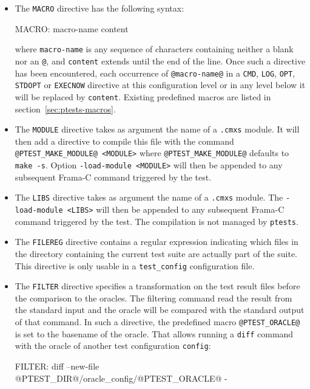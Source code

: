 \begin{itemize}
\item The \texttt{MACRO} directive
  has the following syntax:
  \begin{code}
    MACRO: macro-name content
  \end{code}
  where \texttt{macro-name} is any sequence of characters containing neither
  a blank nor an \texttt{@}, and \texttt{content} extends until the end of the
  line. Once such a directive has been encountered, each occurrence of
  \texttt{@macro-name@} in a \texttt{CMD}, \texttt{LOG}, \texttt{OPT},
  \texttt{STDOPT} or \texttt{EXECNOW} directive at this configuration level
  or in any level below it will be replaced by \texttt{content}. Existing
  predefined macros are listed in section~\ref{sec:ptests-macros}.
\item The \texttt{MODULE}
 directive takes as argument the name of a \texttt{.cmxs}
  module. It will then add a directive to compile this file with the
  command \texttt{@PTEST\_MAKE\_MODULE@ <MODULE>} where
  \texttt{@PTEST\_MAKE\_MODULE@} defaults to \texttt{make -s}. Option
  \texttt{-load-module <MODULE>} will then be appended to any subsequent Frama-C
  command triggered by the test.
\item The \texttt{LIBS}
 directive takes as argument the name of a \texttt{.cmxs}
  module. The \texttt{-load-module <LIBS>} will then be appended to any subsequent Frama-C command triggered by the test. The compilation is not managed by \texttt{ptests}.
\item The \texttt{FILEREG}
  directive contains a regular expression indicating which files in
  the directory containing the current test suite are actually part of
  the suite. This directive is only
  usable in a \texttt{test\_config}
  configuration file.
\item The \texttt{FILTER} directive specifies
  a transformation on the test result files before the comparison to the oracles.
  The filtering command read the result from the standard input and the oracle
  will be compared with the standard output of that command.
  In such a directive, the predefined macro \texttt{@PTEST\_ORACLE@} is set to the
  basename of the oracle.
  That allows running a \texttt{diff} command with the oracle of another
  test configuration \texttt{config}:
  \begin{code}
FILTER: diff --new-file @PTEST_DIR@/oracle_config/@PTEST_ORACLE@ -

\end{code}
\end{itemize}

